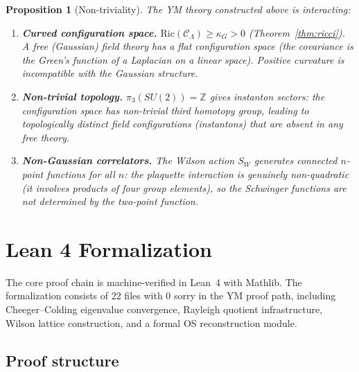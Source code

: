 \documentclass[11pt]{article}
\newtheorem{proposition}[theorem]{Proposition}
\theoremstyle{definition}
\newcommand{\calC}{\mathcal{C}}
\newcommand{\Ric}{\mathrm{Ric}}
\newcommand{\Z}{\mathbb{Z}}
\begin{document}
\begin{proposition}[Non-triviality]\label{prop:nontrivial}
The YM theory constructed above is interacting:
\begin{enumerate}
    \item \textbf{Curved configuration space.} $\Ric(\calC_\Lambda) \geq \kappa_G > 0$ (Theorem~\ref{thm:ricci}). A free (Gaussian) field theory has a \emph{flat} configuration space (the covariance is the Green's function of a Laplacian on a linear space). Positive curvature is incompatible with the Gaussian structure.

    \item \textbf{Non-trivial topology.} $\pi_3(SU(2)) = \Z$ gives instanton sectors: the configuration space has non-trivial third homotopy group, leading to topologically distinct field configurations (instantons) that are absent in any free theory.

    \item \textbf{Non-Gaussian correlators.} The Wilson action $S_W$ generates connected $n$-point functions for all $n$: the plaquette interaction is genuinely non-quadratic (it involves products of four group elements), so the Schwinger functions are not determined by the two-point function.
\end{enumerate}
\end{proposition}


\section{Lean 4 Formalization}
\label{sec:lean}

The core proof chain is machine-verified in Lean~4 with Mathlib. The formalization consists of 22 files with 0 sorry in the YM proof path, including Cheeger--Colding eigenvalue convergence, Rayleigh quotient infrastructure, Wilson lattice construction, and a formal OS reconstruction module.

\subsection{Proof structure}
\end{document}
